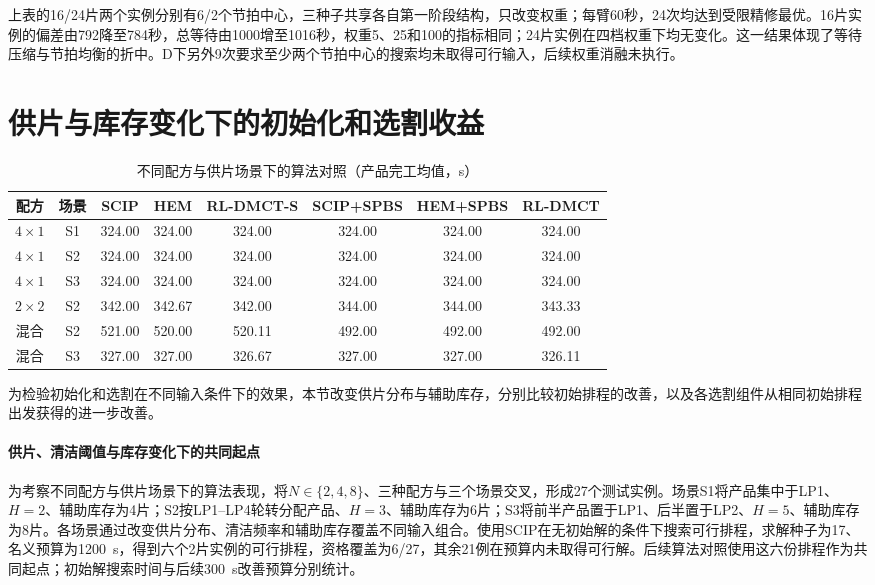 上表的16/24片两个实例分别有6/2个节拍中心，三种子共享各自第一阶段结构，只改变权重；每臂60秒，24次均达到受限精修最优。16片实例的偏差由792降至784秒，总等待由1000增至1016秒，权重5、25和100的指标相同；24片实例在四档权重下均无变化。这一结果体现了等待压缩与节拍均衡的折中。D下另外9次要求至少两个节拍中心的搜索均未取得可行输入，后续权重消融未执行。
\section{供片与库存变化下的初始化和选割收益}
\label{sec:journal-transfer-cn}

\begin{table}[!t]
\centering\small
\caption{不同配方与供片场景下的算法对照（产品完工均值，s）}
\label{tab:journal-transfer-cn}
\begin{adjustbox}{max width=\linewidth}
\begin{tabular}{cccccccc}\toprule
配方 & 场景 & SCIP & HEM & RL-DMCT-S & SCIP+SPBS & HEM+SPBS & RL-DMCT\\\midrule
$4\times1$ & S1 & 324.00 & 324.00 & 324.00 & 324.00 & 324.00 & 324.00\\
$4\times1$ & S2 & 324.00 & 324.00 & 324.00 & 324.00 & 324.00 & 324.00\\
$4\times1$ & S3 & 324.00 & 324.00 & 324.00 & 324.00 & 324.00 & 324.00\\
$2\times2$ & S2 & 342.00 & 342.67 & 342.00 & 344.00 & 344.00 & 343.33\\
混合 & S2 & 521.00 & 520.00 & 520.11 & 492.00 & 492.00 & 492.00\\
混合 & S3 & 327.00 & 327.00 & 326.67 & 327.00 & 327.00 & 326.11\\
\bottomrule\end{tabular}
\end{adjustbox}
\end{table}

为检验初始化和选割在不同输入条件下的效果，本节改变供片分布与辅助库存，分别比较初始排程的改善，以及各选割组件从相同初始排程出发获得的进一步改善。

\paragraph{供片、清洁阈值与库存变化下的共同起点}

为考察不同配方与供片场景下的算法表现，将$N\in\{2,4,8\}$、三种配方与三个场景交叉，形成27个测试实例。场景S1将产品集中于LP1、$H=2$、辅助库存为4片；S2按LP1--LP4轮转分配产品、$H=3$、辅助库存为6片；S3将前半产品置于LP1、后半置于LP2、$H=5$、辅助库存为8片。各场景通过改变供片分布、清洁频率和辅助库存覆盖不同输入组合。使用SCIP在无初始解的条件下搜索可行排程，求解种子为17、名义预算为1200~s，得到六个2片实例的可行排程，资格覆盖为6/27，其余21例在预算内未取得可行解。后续算法对照使用这六份排程作为共同起点；初始解搜索时间与后续300~s改善预算分别统计。

